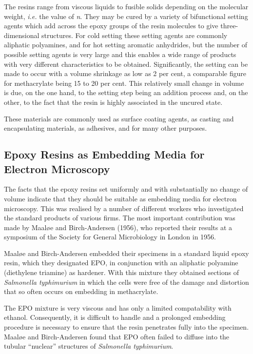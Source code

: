 \documentclass{article}
\begin{document}
The resins range from viscous liquids to fusible solids depending on the molecular weight, \textit{i.e.} the value of \textit{n}. They may be cured by a variety of bifunctional setting agents which add across the epoxy groups of the resin molecules to give three-dimensional structures. For cold setting these setting agents are commonly aliphatic polyamines, and for hot setting aromatic anhydrides, but the number of possible setting agents is very large and this enables a wide range of products with very different characteristics to be obtained. Significantly, the setting can be made to occur with a volume shrinkage as low as 2 per cent, a comparable figure for methacrylate being 15 to 20 per cent. This relatively small change in volume is due, on the one hand, to the setting step being an addition process and, on the other, to the fact that the resin is highly associated in the uncured state.

These materials are commonly used as surface coating agents, as casting and encapsulating materials, as adhesives, and for many other purposes.

\subsection*{Epoxy Resins as Embedding Media for Electron Microscopy}

The facts that the epoxy resins set uniformly and with substantially no change of volume indicate that they should be suitable as embedding media for electron microscopy. This was realised by a number of different workers who investigated the standard products of various firms. The most important contribution was made by Maaløe and Birch-Andersen (1956), who reported their results at a symposium of the Society for General Microbiology in London in 1956.

Maaløe and Birch-Andersen embedded their specimens in a standard liquid epoxy resin, which they designated EPO, in conjunction with an aliphatic polyamine (diethylene triamine) as hardener. With this mixture they obtained sections of \textit{Salmonella typhimurium} in which the cells were free of the damage and distortion that so often occurs on embedding in methacrylate.

The EPO mixture is very viscous and has only a limited compatability with ethanol. Consequently, it is difficult to handle and a prolonged embedding procedure is necessary to ensure that the resin penetrates fully into the specimen. Maaløe and Birch-Andersen found that EPO often failed to diffuse into the tubular ``nuclear'' structures of \textit{Salmonella typhimurium}.
\end{document}
